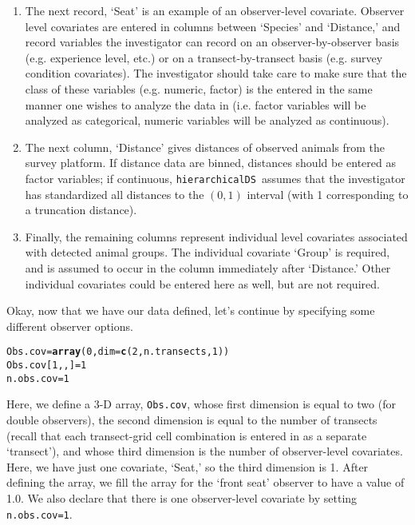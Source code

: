 \documentclass{article}\usepackage{graphicx, color}
\makeatletter
\newcommand{\hlfunctioncall}[1]{\textcolor[rgb]{0.501960784313725,0,0.329411764705882}{\textbf{#1}}}%
\newenvironment{kframe}{%
 \def\at@end@of@kframe{}%
 \ifinner\ifhmode%
  \def\at@end@of@kframe{\end{minipage}}%
  \begin{minipage}{\columnwidth}%
 \fi\fi%
 \def\FrameCommand##1{\hskip\@totalleftmargin \hskip-\fboxsep
 \colorbox{shadecolor}{##1}\hskip-\fboxsep
     \hskip-\linewidth \hskip-\@totalleftmargin \hskip\columnwidth}%
 \MakeFramed {\advance\hsize-\width
   \@totalleftmargin\z@ \linewidth\hsize
   \@setminipage}}%
 {\par\unskip\endMakeFramed%
 \at@end@of@kframe}
\newenvironment{knitrout}{}{} %
\newcommand{\hDS}{\texttt{hierarchicalDS }}
\makeatother
\begin{document}
\begin{enumerate}
\item The next record, `Seat' is an example of an observer-level covariate.  Observer level covariates are entered in columns between `Species' and `Distance,' and record variables the investigator can record on an observer-by-observer basis (e.g. experience level, etc.) or on a transect-by-transect basis (e.g. survey condition covariates).  The investigator should take care to make sure that the class of these variables (e.g. numeric, factor) is the entered in the same manner one wishes to analyze the data in (i.e. factor variables will be analyzed as categorical, numeric variables will be analyzed as continuous).  \\
\item The next column, `Distance' gives distances of observed animals from the survey platform.  If distance data are binned, distances should be entered as factor variables; if continuous, \hDS assumes that the investigator has standardized all distances to the $(0,1)$ interval (with 1 corresponding to a truncation distance).  \item Finally, the remaining columns represent individual level covariates associated with detected animal groups.  The individual covariate `Group' is required, and is assumed to occur in the column immediately after `Distance.'  Other individual covariates could be entered here as well, but are not required.
\end{enumerate}

Okay, now that we have our data defined, let's continue by specifying some different observer options.

\begin{knitrout}
\color{fgcolor}\begin{kframe}
\begin{alltt}
Obs.cov = \hlfunctioncall{array}(0, dim = \hlfunctioncall{c}(2, n.transects, 1))
Obs.cov[1, , ] = 1
n.obs.cov = 1
\end{alltt}
\end{kframe}
\end{knitrout}


Here, we define a 3-D array, \texttt{Obs.cov}, whose first dimension is 
equal to two (for double observers), the second dimension is equal to the number of 
transects (recall that each transect-grid cell combination is entered in as a 
separate `transect'), and whose third dimension is the number of observer-level covariates.  Here, we have just one covariate, `Seat,' so the third dimension is 1.  After defining the array, we fill the array for the `front seat' observer to have a value of 1.0.  We also declare that there is one observer-level covariate by setting
\texttt{n.obs.cov=1}.
\end{document}

